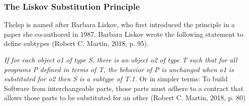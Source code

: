 \subsubsection{The Liskov Substitution Principle} \label{subsubsec_lsp}

The\gls{lsp} is named after Barbara Liskov, who first introduced the principle in a paper
she co-authored in 1987. Barbara Liskov wrote the following statement to define subtypes
(Robert C. Martin, 2018, p. 95). 

\textit{If for each object o1 of type S, there is an object o2 of
type T such that for all programs P defined in terms of T, the behavior of P is unchanged
when o1 is substituted for o2 then S is a subtype of T.1.} Or in simpler terms: To build
Software from interchangeable parts, those parts must adhere to a contract that allows
those parts to be substituted for an other (Robert C. Martin, 2018, p. 80)